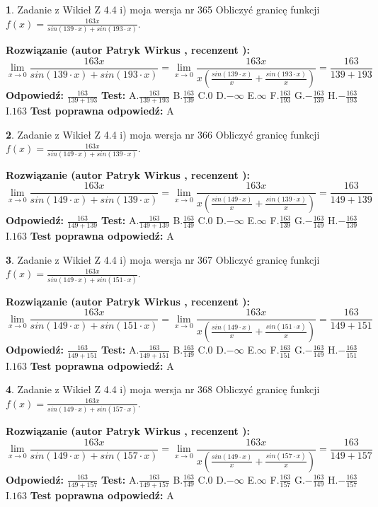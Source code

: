\documentclass[12pt, a4paper]{article}
\theoremstyle{definition} %
\newtheorem{zad}{}
\newcommand{\zadStart}[1]{\begin{zad}#1\newline}
\newcommand{\zadStop}{\end{zad}}
\newcommand{\rozwStart}[2]{\noindent \textbf{Rozwiązanie (autor #1 , recenzent #2): }\newline}
\newcommand{\rozwStop}{\newline}
\newcommand{\odpStart}{\noindent \textbf{Odpowiedź:}\newline}
\newcommand{\odpStop}{\newline}
\newcommand{\testStart}{\noindent \textbf{Test:}\newline}
\newcommand{\testStop}{\newline}
\newcommand{\kluczStart}{\noindent \textbf{Test poprawna odpowiedź:}\newline}
\newcommand{\kluczStop}{\newline}
\begin{document}
\zadStart{Zadanie z Wikieł Z 4.4 i) moja wersja nr 365}
Obliczyć granicę funkcji $f(x)=\frac{163x}{sin(139\cdot x) +sin(193\cdot x)}$.
\zadStop
\rozwStart{Patryk Wirkus}{}
$$\lim\limits_{x\to 0}\frac{163x}{sin(139\cdot x) +sin(193\cdot x)}=\lim\limits_{x\to 0}\frac{163x}{x(\frac{sin(139\cdot x)}{x}+\frac{sin(193\cdot x)}{x})}=\frac{163}{139+193}$$
\rozwStop
\odpStart
$\frac{163}{139+193}$
\odpStop
\testStart
A.$\frac{163}{139+193}$
B.$\frac{163}{139}$
C.$0$
D.$-\infty$
E.$\infty$
F.$\frac{163}{193}$
G.$-\frac{163}{139}$
H.$-\frac{163}{193}$
I.$163$
\testStop
\kluczStart
A
\kluczStop



\zadStart{Zadanie z Wikieł Z 4.4 i) moja wersja nr 366}
Obliczyć granicę funkcji $f(x)=\frac{163x}{sin(149\cdot x) +sin(139\cdot x)}$.
\zadStop
\rozwStart{Patryk Wirkus}{}
$$\lim\limits_{x\to 0}\frac{163x}{sin(149\cdot x) +sin(139\cdot x)}=\lim\limits_{x\to 0}\frac{163x}{x(\frac{sin(149\cdot x)}{x}+\frac{sin(139\cdot x)}{x})}=\frac{163}{149+139}$$
\rozwStop
\odpStart
$\frac{163}{149+139}$
\odpStop
\testStart
A.$\frac{163}{149+139}$
B.$\frac{163}{149}$
C.$0$
D.$-\infty$
E.$\infty$
F.$\frac{163}{139}$
G.$-\frac{163}{149}$
H.$-\frac{163}{139}$
I.$163$
\testStop
\kluczStart
A
\kluczStop



\zadStart{Zadanie z Wikieł Z 4.4 i) moja wersja nr 367}
Obliczyć granicę funkcji $f(x)=\frac{163x}{sin(149\cdot x) +sin(151\cdot x)}$.
\zadStop
\rozwStart{Patryk Wirkus}{}
$$\lim\limits_{x\to 0}\frac{163x}{sin(149\cdot x) +sin(151\cdot x)}=\lim\limits_{x\to 0}\frac{163x}{x(\frac{sin(149\cdot x)}{x}+\frac{sin(151\cdot x)}{x})}=\frac{163}{149+151}$$
\rozwStop
\odpStart
$\frac{163}{149+151}$
\odpStop
\testStart
A.$\frac{163}{149+151}$
B.$\frac{163}{149}$
C.$0$
D.$-\infty$
E.$\infty$
F.$\frac{163}{151}$
G.$-\frac{163}{149}$
H.$-\frac{163}{151}$
I.$163$
\testStop
\kluczStart
A
\kluczStop



\zadStart{Zadanie z Wikieł Z 4.4 i) moja wersja nr 368}
Obliczyć granicę funkcji $f(x)=\frac{163x}{sin(149\cdot x) +sin(157\cdot x)}$.
\zadStop
\rozwStart{Patryk Wirkus}{}
$$\lim\limits_{x\to 0}\frac{163x}{sin(149\cdot x) +sin(157\cdot x)}=\lim\limits_{x\to 0}\frac{163x}{x(\frac{sin(149\cdot x)}{x}+\frac{sin(157\cdot x)}{x})}=\frac{163}{149+157}$$
\rozwStop
\odpStart
$\frac{163}{149+157}$
\odpStop
\testStart
A.$\frac{163}{149+157}$
B.$\frac{163}{149}$
C.$0$
D.$-\infty$
E.$\infty$
F.$\frac{163}{157}$
G.$-\frac{163}{149}$
H.$-\frac{163}{157}$
I.$163$
\testStop
\kluczStart
A
\kluczStop
\end{document}
